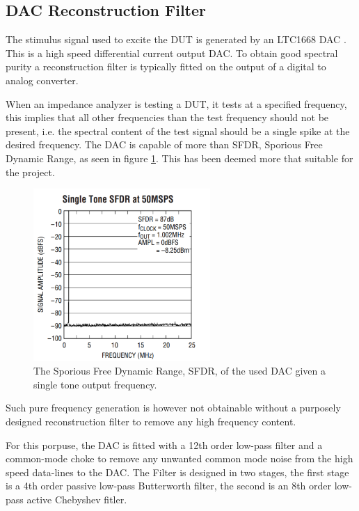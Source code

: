 \subsection{DAC Reconstruction Filter} \label{subsec:DAC_Filter}
The stimulus signal used to excite the DUT is generated by an LTC1668 DAC \cite{DAC_LTC1668}. This is a high speed differential current output DAC. To obtain good spectral purity a reconstruction filter is typically fitted on the output of a digital to analog converter.

When an impedance analyzer is testing a DUT, it tests at a specified frequency, this implies that all other frequencies than the test frequency should not be present, i.e. the spectral content of the test signal should be a single spike at the desired frequency. The DAC is capable of more than  SFDR, Sporious Free Dynamic Range, as seen in figure \ref{fig_7_1_1_SFDR}. This has been deemed more that suitable for the project. 

\begin{figure}[H]
    \centering
    \includegraphics[clip, trim=0 0 0 0, width=0.6\textwidth]{Sections/7_SystemDesign/Figures/7_1_1_DAC_SingleTone_SFDR.pdf}
    \caption{The Sporious Free Dynamic Range, SFDR, of the used DAC given a single tone output frequency.}
    \label{fig_7_1_1_SFDR}
\end{figure}

Such pure frequency generation is however not obtainable without a purposely designed reconstruction filter to remove any high frequency content.

For this porpuse, the DAC is fitted with a 12th order low-pass filter and a common-mode choke to remove any unwanted common mode noise from the high speed data-lines to the DAC. The Filter is designed in two stages, the first stage is a 4th order passive low-pass Butterworth filter, the second is an 8th order low-pass active Chebyshev fitler.

